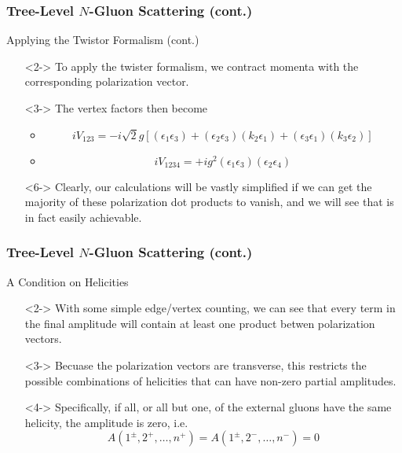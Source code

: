 \documentclass{beamer}
\begin{document}
\begin{frame}
    \frametitle{Tree-Level $N$-Gluon Scattering (cont.)}
    \alert{Applying the Twistor Formalism (cont.)}
    \begin{itemize}
        \item[\textbullet]<2-> To apply the twister formalism, we contract momenta with the corresponding polarization vector.
        \item[\textbullet]<3-> The vertex factors then become 
        \begin{itemize}
            \item<4-> \[ iV_{123} = -i\sqrt{2}g\left[(\epsilon_1\epsilon_3) + (\epsilon_2\epsilon_3)(k_2\epsilon_1) + (\epsilon_3\epsilon_1)(k_3\epsilon_2)\right] \]
            \item<5-> \[ iV_{1234} = +ig^2(\epsilon_1\epsilon_3)(\epsilon_2\epsilon_4) \]  
        \end{itemize}
        \item[\textbullet]<6-> Clearly, our calculations will be vastly simplified if we can get the majority of these polarization dot products to vanish, and we will see that is in fact easily achievable.
    \end{itemize}
\end{frame}

\begin{frame}
    \frametitle{Tree-Level $N$-Gluon Scattering (cont.)}
    \alert{A Condition on Helicities}
    \begin{itemize}
        \item[\textbullet]<2-> With some simple edge/vertex counting, we can see that every term in the final amplitude will contain at least one product betwen polarization vectors.
        \item[\textbullet]<3-> Becuase the polarization vectors are transverse, this restricts the possible combinations of helicities that can have non-zero partial amplitudes.
        \item[\textbullet]<4-> Specifically, if all, or all but one, of the external gluons have the same helicity, the amplitude is zero, i.e. \[ A(1^\pm, 2^+, \ldots, n^+) = A(1^\pm, 2^-, \ldots, n^-) = 0 \] 
    \end{itemize}
\end{frame}
\end{document}
